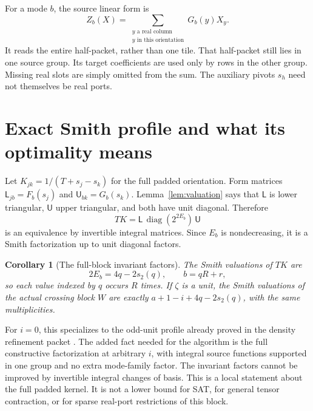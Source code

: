 \documentclass[11pt,letterpaper]{article}
\newtheorem{corollary}[theorem]{Corollary}
\theoremstyle{definition}\newtheorem{definition}[theorem]{Definition}
\theoremstyle{remark}\newtheorem{remark}[theorem]{Remark}
\begin{document}
For a mode $b$, the source linear form is
\begin{equation}\label{eq:sourceform}
 Z_b(X)=\sum_{\substack{y\text{ a real column}\\
                   y\text{ in this orientation}}}G_b(y)X_y.
\end{equation}
It reads the entire half-packet, rather than one tile. That half-packet still
lies in one source group. Its target coefficients are used only by rows in
the other group. Missing real slots are simply omitted from the sum. The
auxiliary pivots $s_h$ need not themselves be real ports.

\section{Exact Smith profile and what its optimality means}
\label{sec:smith}

Let $K_{jk}=1/(T+s_j-s_k)$ for the full padded orientation. Form matrices
$\mathsf L_{jb}=F_b(s_j)$ and $\mathsf U_{bk}=G_b(s_k)$.
Lemma~\ref{lem:valuation} says that $\mathsf L$ is lower triangular,
$\mathsf U$ upper triangular, and both have unit diagonal. Therefore
\begin{equation}\label{eq:ldu}
 TK=\mathsf L\,\operatorname{diag}(2^{2E_b})\,\mathsf U
\end{equation}
is an equivalence by invertible integral matrices. Since $E_b$ is
nondecreasing, it is a Smith factorization up to unit diagonal factors.

\begin{corollary}[The full-block invariant factors]\label{cor:smith}
The Smith valuations of $TK$ are
\[
 2E_b=4q-2s_2(q),\qquad b=qR+r,
\]
so each value indexed by $q$ occurs $R$ times. If $\zeta$ is a unit, the
Smith valuations of the actual crossing block $W$ are exactly
$a+1-i+4q-2s_2(q)$, with the same multiplicities.
\end{corollary}

For $i=0$, this specializes to the odd-unit profile already proved in the
density refinement packet \cite{density}. The added fact needed for the
algorithm is the full constructive factorization at arbitrary $i$, with
integral source functions supported in one group and no extra mode-family
factor. The invariant factors cannot be improved by invertible integral
changes of basis. This is a local statement about the full padded kernel.
It is not a lower bound for SAT, for general tensor contraction, or for sparse
real-port restrictions of this block.
\end{document}
